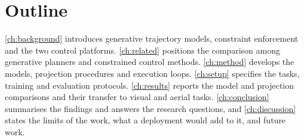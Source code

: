 \section{Outline}\label{sec:intro:outline}

\autoref{ch:background} introduces generative trajectory models, constraint enforcement and the two
control platforms. \autoref{ch:related} positions the comparison among generative planners and
constrained control methods. \autoref{ch:method} develops the models, projection procedures and
execution loops. \autoref{ch:setup} specifies the tasks, training and evaluation protocols.
\autoref{ch:results} reports the model and projection comparisons and their transfer to visual and
aerial tasks. \autoref{ch:conclusion} summarises the findings and answers the research questions, and
\autoref{ch:discussion} states the limits of the work, what a deployment would add to it, and future
work.

